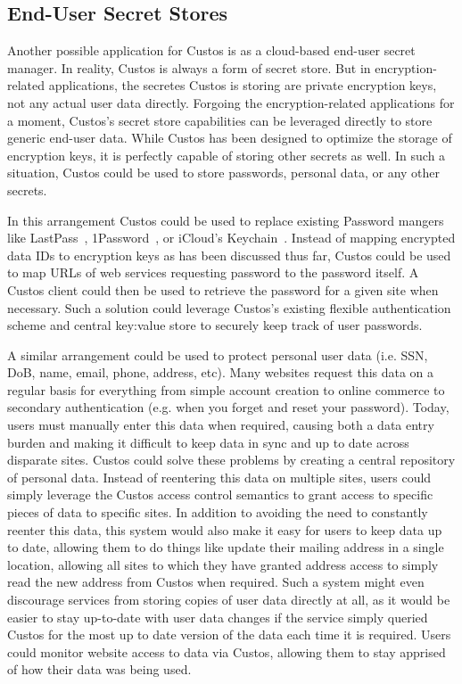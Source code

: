\subsection{End-User Secret Stores}

Another possible application for Custos is as a cloud-based end-user
secret manager. In reality, Custos is always a form of secret
store. But in encryption-related applications, the secretes Custos is
storing are private encryption keys, not any actual user data
directly. Forgoing the encryption-related applications for a moment,
Custos's secret store capabilities can be leveraged directly to store
generic end-user data. While Custos has been designed to optimize the
storage of encryption keys, it is perfectly capable of storing other
secrets as well. In such a situation, Custos could be used to store
passwords, personal data, or any other secrets.

In this arrangement Custos could be used to replace existing Password
mangers like LastPass~\cite{lastpass}, 1Password~\cite{onepassword},
or iCloud's Keychain~\cite{icloud}. Instead of mapping encrypted data
IDs to encryption keys as has been discussed thus far, Custos could be
used to map URLs of web services requesting password to the password
itself. A Custos client could then be used to retrieve the password
for a given site when necessary. Such a solution could leverage
Custos's existing flexible authentication scheme and central key:value
store to securely keep track of user passwords.

A similar arrangement could be used to protect personal user data
(i.e. SSN, DoB, name, email, phone, address, etc). Many websites
request this data on a regular basis for everything from simple
account creation to online commerce to secondary authentication
(e.g. when you forget and reset your password). Today, users must
manually enter this data when required, causing both a data entry
burden and making it difficult to keep data in sync and up to date
across disparate sites. Custos could solve these problems by creating
a central repository of personal data. Instead of reentering this data
on multiple sites, users could simply leverage the Custos access
control semantics to grant access to specific pieces of data to
specific sites. In addition to avoiding the need to constantly reenter
this data, this system would also make it easy for users to keep data
up to date, allowing them to do things like update their mailing
address in a single location, allowing all sites to which they have
granted address access to simply read the new address from Custos when
required. Such a system might even discourage services from storing
copies of user data directly at all, as it would be easier to stay
up-to-date with user data changes if the service simply queried Custos
for the most up to date version of the data each time it is
required. Users could monitor website access to data via Custos,
allowing them to stay apprised of how their data was being used.

